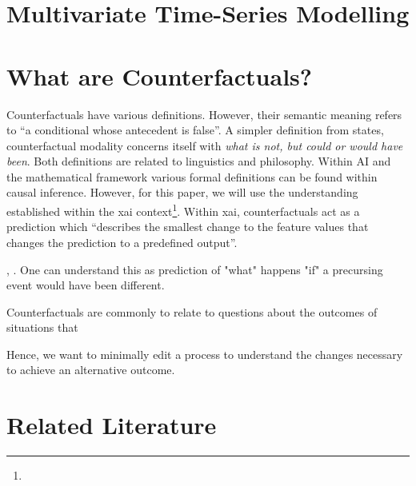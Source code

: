 \documentclass[12pt,a4paper]{report}
\begin{document}
\section{Multivariate Time-Series Modelling}
\label{sec:sequences}

\section{What are Counterfactuals?}

Counterfactuals have various definitions. However, their semantic meaning refers to \enquote{a conditional whose antecedent is false}\autocite{_Counterfactual_}. A simpler definition from \citeauthor{starr_Counterfactuals_2021} states, counterfactual modality concerns itself with \emph{what is not, but could or would have been}.
Both definitions are related to linguistics and philosophy. Within AI and the mathematical framework various formal definitions can be found within causal inference\autocite{hitchcock_CausalModels_2020}. However, for this paper, we will use the understanding established within the \acrfull{xai} context\footnote{}. Within \acrshort{xai}, counterfactuals act as a prediction which \enquote{describes the smallest change to the feature values that changes the prediction to a predefined output}\autocite{molnar2019}.






, .
One can understand this as prediction of "what" happens "if" a precursing event would have been different.


Counterfactuals are commonly to relate to questions about the outcomes of situations that

Hence, we want to minimally edit a process to understand the changes necessary to achieve an alternative outcome.

\section{Related Literature}
\end{document}
